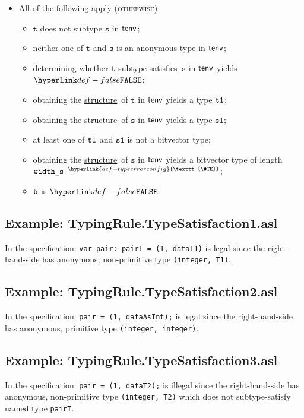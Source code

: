 \documentclass{book}
\newcommand\TypeErrorConfig[0]{\hyperlink{def-typeerrorconfig}{\texttt{\#TE}}}
\newcommand\ProseOrTypeError[0]{\hyperlink{def-proseortypeerror}{$^{\TypeErrorConfig}$}}
\newcommand\structure[0]{\hyperlink{def-structure}{structure}}
\newcommand\subtypesatisfies[0]{\hyperlink{def-subtypesatisfies}{subtype-satisfies}}
\newcommand\vt[0]{\texttt{t}}
\newcommand\vs[0]{\texttt{s}}
\newcommand\vsone[0]{\texttt{s1}}
\begin{document}
\begin{itemize}
  \item All of the following apply (\textsc{otherwise}):
  \begin{itemize}
    \item $\vt$ does not subtype $\vs$ in $\textsf{tenv}$;
    \item neither one of $\vt$ and $\vs$ is an anonymous type in $\textsf{tenv}$;
    \item determining whether $\vt$ \subtypesatisfies\ $\vs$ in $\textsf{tenv}$ yields $\False$;
    \item obtaining the \structure\ of $\vt$ in $\textsf{tenv}$ yields a type $\texttt{t1}$;
    \item obtaining the \structure\ of $\vs$ in $\textsf{tenv}$ yields a type $\vsone$;
    \item at least one of $\texttt{t1}$ and $\vsone$ is not a bitvector type;
    \item obtaining the \structure\ of $\vs$ in $\textsf{tenv}$ yields a bitvector type of length $\texttt{width\_s}$ \ProseOrTypeError;
    \item $\texttt{b}$ is $\False$.
  \end{itemize}
\end{itemize}

\subsection{Example: TypingRule.TypeSatisfaction1.asl}
In the specification:
\texttt{var pair: pairT = (1, dataT1)} is legal since the right-hand-side has
anonymous, non-primitive type \texttt{(integer, T1)}.

\subsection{Example: TypingRule.TypeSatisfaction2.asl}
In the specification:
\texttt{pair = (1, dataAsInt);} is legal since the right-hand-side has anonymous,
primitive type \texttt{(integer, integer)}.

\subsection{Example: TypingRule.TypeSatisfaction3.asl}
In the specification:
\texttt{pair = (1, dataT2);} is illegal since the right-hand-side has anonymous,
non-primitive type \texttt{(integer, T2)} which does not subtype-satisfy named
type \texttt{pairT}.
\end{document}
